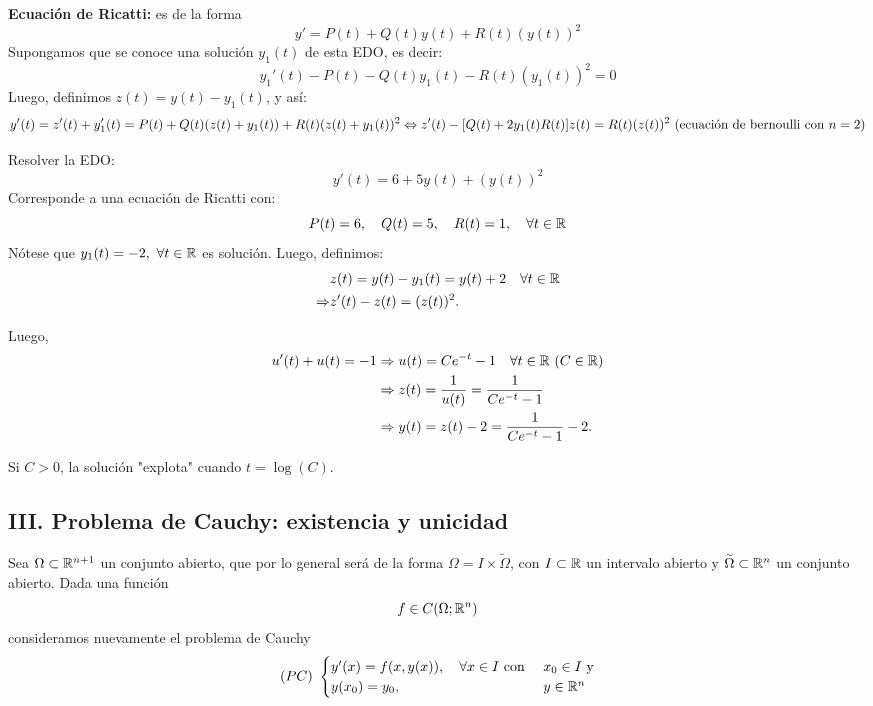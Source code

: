 \documentclass[a4paper]{report}
\begin{document}
	\noindent \textbf{Ecuación de Ricatti:} es de la forma
	\[ y' = P(t) + Q(t)y(t) + R(t)(y(t))^2 \]
	\noindent Supongamos que se conoce una solución $y_1(t)$ de esta EDO, es decir:
	\[ y_1'(t) - P(t) - Q(t)y_1(t) - R(t)(y_1(t))^2 = 0\]
	\noindent Luego, definimos $z(t) = y(t) - y_1(t)$, y así:
	\[ y'(t) = z'(t) + y_1'(t) = P(t) + Q(t)(z(t) + y_1(t)) + R(t)(z(t) + y_1(t))^2 \\
	\iff z'(t) - [Q(t) + 2y_1(t) R(t)] z(t) = R(t)(z(t))^2 \ (\text{ecuación de bernoulli con } n=2) \]

	\begin{eg}
		Resolver la EDO:
		\[ y'(t) = 6 + 5y(t) + (y(t))^2 \]
		\noindent Corresponde a una ecuación de Ricatti con:
		\[ P(t)=6, \quad Q(t)=5,\quad R(t)=1,\quad \forall t \in \mathbb{R} \]
		\noindent Nótese que $y_1(t) = -2,\ \forall t \in \R$ es solución. Luego, definimos:
		\begin{align*}
			& z(t) = y(t) - y_1(t) = y(t) + 2 \quad \forall t \in \mathbb{R} \\
			\Rightarrow & z'(t) - z(t) = (z(t))^2
		.\end{align*}

		\noindent Luego,
		\begin{align*}
			u'(t) + u(t) = -1 & \Rightarrow u(t) = C e^{-t} - 1 \quad \forall t \in \mathbb{R} \ (C \in \mathbb{R}) \\
			& \Rightarrow z(t) = \frac{1}{u(t)} = \frac{1}{C e^{-t} -1} \\
			& \Rightarrow y(t) = z(t) - 2 = \frac{1}{C e^{-t} -1 }-2
		.\end{align*}
	\end{eg}
		\begin{note}
			Si $C>0$, la solución "explota" cuando $ t = \log (C)$. 
		\end{note}

		\subsection{III. Problema de Cauchy: existencia y unicidad}

		Sea $\Omega \subset \mathbb{R}^{n+1}$ un conjunto abierto, que por lo general será de la forma $ \Omega = I \times \widetilde{\Omega}$, con $I \subset \mathbb{R}$ un intervalo abierto y $\widetilde{\Omega}\subset \mathbb{R}^{n}$ un conjunto abierto. Dada una función
		\[ f \in C (\Omega;\mathbb{R}^n) \]
		\noindent consideramos nuevamente el problema de Cauchy
		\begin{align*} (PC) \ \begin{cases}
			 y'(x) = f(x,y(x)), \quad \forall x \in I \text{ con } & x_0 \in I \text{ y} \\
			 y(x_0) = y_0, & y \in \mathbb{R}^n
		\end{cases} \end{align*}
\end{document}
